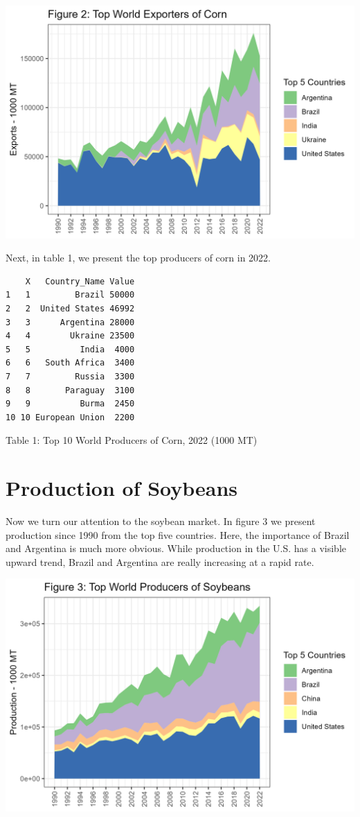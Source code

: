 \documentclass[
  letterpaper,
  DIV=11,
  numbers=noendperiod]{scrreprt}
\begin{document}
\includegraphics{assets/SouthAmericanProduction_TopExporterCorn.png}

Next, in table 1, we present the top producers of corn in 2022.

\begin{verbatim}
    X   Country_Name Value
1   1         Brazil 50000
2   2  United States 46992
3   3      Argentina 28000
4   4        Ukraine 23500
5   5          India  4000
6   6   South Africa  3400
7   7         Russia  3300
8   8       Paraguay  3100
9   9          Burma  2450
10 10 European Union  2200
\end{verbatim}

Table 1: Top 10 World Producers of Corn, 2022 (1000 MT)

\section{Production of Soybeans}\label{production-of-soybeans}

Now we turn our attention to the soybean market. In figure 3 we present
production since 1990 from the top five countries. Here, the importance
of Brazil and Argentina is much more obvious. While production in the
U.S. has a visible upward trend, Brazil and Argentina are really
increasing at a rapid rate.

\includegraphics{assets/SouthAmericanProd_TopProdSoy.png}
\end{document}
